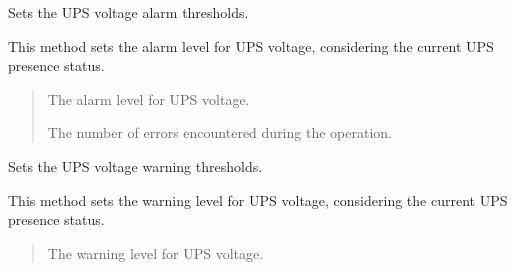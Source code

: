 \documentclass[letterpaper,10pt,english]{sphinxmanual}
\begin{document}
\begin{fulllineitems}
\begin{fulllineitems}
\end{fulllineitems}


\begin{fulllineitems}
\label{\detokenize{apidocs:subrack_management_board.SubrackMngBoard.SetUPSVoltageAlarmThresholds}}
\pysigstartsignatures
{}
\pysigstopsignatures
\sphinxAtStartPar
Sets the UPS voltage alarm thresholds.

\sphinxAtStartPar
This method sets the alarm level for UPS voltage, considering the current
UPS presence status.
\begin{quote}\begin{description}
\sphinxAtStartPar
{} \textendash{} The alarm level for UPS voltage.

\sphinxAtStartPar
The number of errors encountered during the operation.

\end{description}\end{quote}

\end{fulllineitems}


\begin{fulllineitems}
\label{\detokenize{apidocs:subrack_management_board.SubrackMngBoard.SetUPSVoltageWarningThresholds}}
\pysigstartsignatures
{}
\pysigstopsignatures
\sphinxAtStartPar
Sets the UPS voltage warning thresholds.

\sphinxAtStartPar
This method sets the warning level for UPS voltage, considering the current
UPS presence status.
\begin{quote}\begin{description}
\sphinxAtStartPar
{} \textendash{} The warning level for UPS voltage.


\end{description}
\end{quote}
\end{fulllineitems}
\end{fulllineitems}
\end{document}
